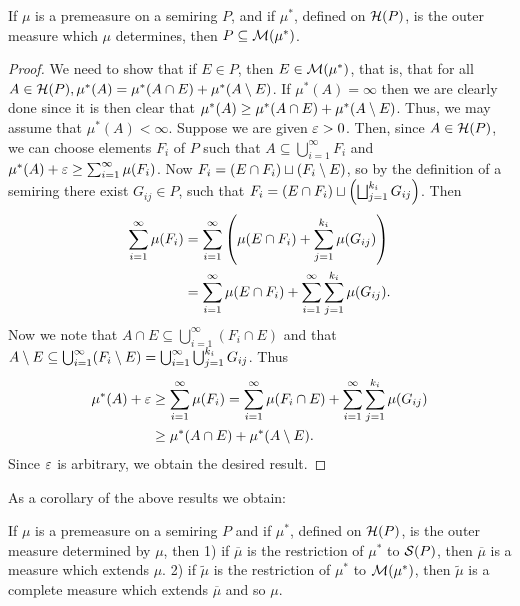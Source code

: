 \begin{theorem}
If $\mu$ is a premeasure on a semiring $P$, and if $\mu^*$, defined on ${\cal H}(P)$, is the outer measure which $\mu$ determines, then $P \subseteq {\cal M}(\mu^*)$.
\end{theorem}
\begin{proof}
We need to show that if $E \in P$, then $E \in {\cal M}(\mu^*)$, that is, that for all $A \in {\cal H}(P), \mu^*(A)=\mu^*(A \cap E)+\mu^*(A\setminus E)$. If $\mu^*(A)=\infty$ then we are clearly done since it is then clear that $\mu^*(A) \geq \mu^*(A \cap E)+\mu^*(A\setminus E)$. Thus, we may assume that $\mu^*(A)<\infty$. Suppose we are given $\varepsilon>0$. Then, since $A \in {\cal H}(P)$, we can choose elements $F_i$ of $P$ such that $A \subseteq \bigcup_{i=1}^\infty F_i$ and $\mu^*(A)+\varepsilon \geq \sum_{i=1}^\infty \mu(F_i)$. Now $F_i=(E \cap F_i) \sqcup(F_i\setminus E)$, so by the definition of a semiring there exist $G_{ij} \in P$, such that $F_i=(E \cap F_i) \sqcup\left(\bigsqcup_{j=1}^{k_i}G_{ij}\right)$. Then
\begin{align*}
\sum_{i=1}^\infty \mu(F_i)&=\sum_{i=1}^\infty\left(\mu(E \cap F_i)+\sum_{j=1}^{k_i} \mu(G_{i j})\right) \\
&=\sum_{i=1}^\infty \mu(E \cap F_i)+\sum_{i=1}^\infty \sum_{j=1}^{k_i} \mu(G_{i j}).
\end{align*}
Now we note that $A \cap E\subseteq \bigcup_{i=1}^\infty(F_i \cap E)$ and that $A\setminus E\subseteq \bigcup_{i=1}^\infty(F_i\setminus E)=\bigcup_{i=1}^\infty \bigcup_{j=1}^{k_i} G_{ij} $. Thus
\begin{align*}
    \mu^*(A)+\varepsilon&\geq\sum_{i=1}^\infty\mu(F_i)=\sum_{i=1}^\infty \mu(F_i \cap E)+\sum_{i=1}^\infty \sum_{j=1}^{k_i}\mu(G_{i j})\\
    &\geq\mu^*(A \cap E)+\mu^*(A\setminus E).
\end{align*}
Since $\varepsilon$ is arbitrary, we obtain the desired result.
\end{proof}

As a corollary of the above results we obtain:

\begin{theorem}\label{thm:measure extension thm}
If $\mu$ is a premeasure on a semiring $P$ and if $\mu^*$, defined on ${\cal H}(P)$, is the outer measure determined by $\mu$, then 1) if $\overline{\mu}$ is the restriction of $\mu^*$ to ${\cal S}(P)$, then $\overline{\mu}$ is a measure which extends $\mu$. 2) if $\widetilde{\mu}$ is the restriction of $\mu^*$ to ${\cal M}(\mu^*)$, then $\widetilde{\mu}$ is a complete measure which extends $\overline{\mu}$ and so $\mu$.
\end{theorem}

